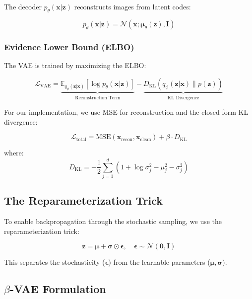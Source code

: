 \documentclass[11pt,a4paper]{article}
\begin{document}
The decoder $p_\theta(\mathbf{x}|\mathbf{z})$ reconstructs images from latent codes:

\begin{equation}
    p_\theta(\mathbf{x}|\mathbf{z}) = \mathcal{N}(\mathbf{x}; \bm{\mu}_\theta(\mathbf{z}), \mathbf{I})
\end{equation}

\subsubsection{Evidence Lower Bound (ELBO)}

The VAE is trained by maximizing the ELBO:

\begin{equation}
    \mathcal{L}_{\text{VAE}} = \underbrace{\mathbb{E}_{q_\phi(\mathbf{z}|\mathbf{x})}[\log p_\theta(\mathbf{x}|\mathbf{z})]}_{\text{Reconstruction Term}} - \underbrace{D_{\text{KL}}(q_\phi(\mathbf{z}|\mathbf{x}) \| p(\mathbf{z}))}_{\text{KL Divergence}}
\end{equation}

For our implementation, we use MSE for reconstruction and the closed-form KL divergence:

\begin{equation}
    \mathcal{L}_{\text{total}} = \text{MSE}(\mathbf{x}_{\text{recon}}, \mathbf{x}_{\text{clean}}) + \beta \cdot D_{\text{KL}}
\end{equation}

where:
\begin{equation}
    D_{\text{KL}} = -\frac{1}{2} \sum_{j=1}^{d} \left(1 + \log\sigma_j^2 - \mu_j^2 - \sigma_j^2\right)
\end{equation}

\subsection{The Reparameterization Trick}

To enable backpropagation through the stochastic sampling, we use the reparameterization trick:

\begin{equation}
    \mathbf{z} = \bm{\mu} + \bm{\sigma} \odot \bm{\epsilon}, \quad \bm{\epsilon} \sim \mathcal{N}(\mathbf{0}, \mathbf{I})
\end{equation}

This separates the stochasticity ($\bm{\epsilon}$) from the learnable parameters ($\bm{\mu}, \bm{\sigma}$).

\subsection{$\beta$-VAE Formulation}
\end{document}
